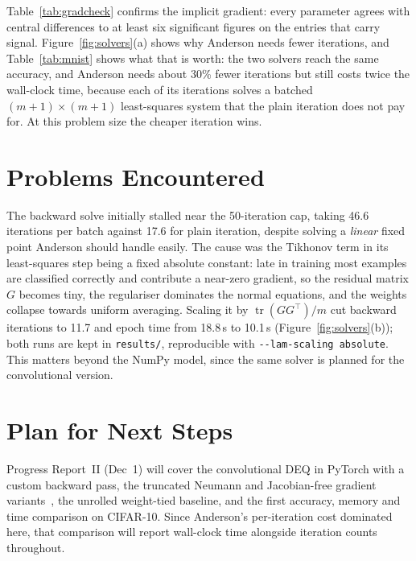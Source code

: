 \documentclass[11pt]{article}
\begin{document}
Table~\ref{tab:gradcheck} confirms the implicit gradient: every parameter
agrees with central differences to at least six significant figures on the
entries that carry signal. Figure~\ref{fig:solvers}(a) shows why Anderson needs
fewer iterations, and Table~\ref{tab:mnist} shows what that is worth: the two
solvers reach the same accuracy, and Anderson needs about 30\% fewer iterations
but still costs twice the wall-clock time, because each of its iterations solves
a batched $(m{+}1)\times(m{+}1)$ least-squares system that the plain iteration
does not pay for. At this problem size the cheaper iteration wins.

\section{Problems Encountered}

The backward solve initially stalled near the 50-iteration cap, taking 46.6
iterations per batch against 17.6 for plain iteration, despite solving a
\emph{linear} fixed point Anderson should handle easily. The cause was the
Tikhonov term in its least-squares step being a fixed absolute constant: late
in training most examples are classified correctly and contribute a near-zero
gradient, so the residual matrix $G$ becomes tiny, the regulariser dominates
the normal equations, and the weights collapse towards uniform averaging.
Scaling it by $\operatorname{tr}(GG^{\!\top})/m$ cut backward iterations to
11.7 and epoch time from 18.8\,s to 10.1\,s (Figure~\ref{fig:solvers}(b)); both
runs are kept in \texttt{results/}, reproducible with
\texttt{-{}-lam-scaling absolute}. This matters beyond the NumPy model, since
the same solver is planned for the convolutional version.

\section{Plan for Next Steps}

Progress Report~II (Dec~1) will cover the convolutional DEQ in PyTorch with a
custom backward pass, the truncated Neumann and Jacobian-free gradient
variants~\cite{geng2021training,fung2022jfb}, the unrolled weight-tied
baseline, and the first accuracy, memory and time comparison on CIFAR-10.
Since Anderson's per-iteration cost dominated here, that comparison will report
wall-clock time alongside iteration counts throughout.

\printrefs
\end{document}
